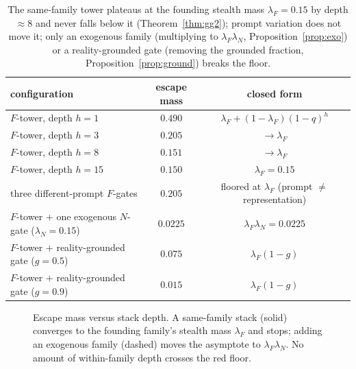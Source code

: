 \documentclass[11pt]{article}
\theoremstyle{definition}
\theoremstyle{remark}
\newcommand{\lF}{\lambda_{F}}
\newcommand{\lN}{\lambda_{N}}
\begin{document}
\begin{table}[h]
\centering
\small
\begin{tabular}{lcc}
\toprule
configuration & escape mass & closed form \\
\midrule
$F$-tower, depth $h=1$ & $0.490$ & $\lF+(1-\lF)(1-q)^h$ \\
$F$-tower, depth $h=3$ & $0.205$ & $\to\lF$ \\
$F$-tower, depth $h=8$ & $0.151$ & $\to\lF$ \\
$F$-tower, depth $h=15$ & $0.150$ & $\lF=0.15$ \\
three different-prompt $F$-gates & $0.205$ & floored at $\lF$ (prompt $\neq$ representation) \\
$F$-tower $+$ one exogenous $N$-gate ($\lN=0.15$) & $0.0225$ & $\lF\lN=0.0225$ \\
$F$-tower $+$ reality-grounded gate ($g=0.5$) & $0.075$ & $\lF(1-g)$ \\
$F$-tower $+$ reality-grounded gate ($g=0.9$) & $0.015$ & $\lF(1-g)$ \\
\bottomrule
\end{tabular}
\caption{The same-family tower plateaus at the founding stealth mass $\lF=0.15$ by depth $\approx 8$
and never falls below it (Theorem~\ref{thm:gg2}); prompt variation does not move it; only an
exogenous family (multiplying to $\lF\lN$, Proposition~\ref{prop:exo}) or a reality-grounded gate
(removing the grounded fraction, Proposition~\ref{prop:ground}) breaks the floor.}
\label{tab:num}
\end{table}

\begin{figure}[h]
\centering
{}
\caption{Escape mass versus stack depth. A same-family stack (solid) converges to the founding
family's stealth mass $\lF$ and stops; adding an exogenous family (dashed) moves the asymptote to
$\lF\lN$. No amount of within-family depth crosses the red floor.}
\label{fig:floor}
\end{figure}
\end{document}
